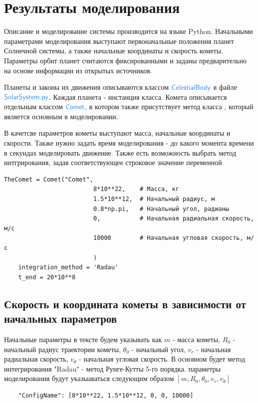 \section{Результаты моделирования}
Описание и моделирование системы производится на языке Python.
Начальными параметрами моделирования выступают первоначальные положения планет Солнечной системы,
а также начальные координаты и скорость кометы. Параметры орбит планет считаются фиксированными и заданы предварительно
на основе информации из открытых источников.

Планеты и законы их движения описываются классом $\cdw{CelestialBody}$ в файле $\cdw{SolarSystem.py}$.
Каждая планета - инстанция класса. Комета описывается отдельным классом $\cdw{Comet}$, в котором также 
присутствует метод класса , который является основным в моделировании.

В качетсве параметров кометы выступают масса, начальные координаты и скорости. Также нужно задать время моделирования
 - до какого момента времени в секундах моделировать движение. Также есть возможность выбрать метод
интгрирования, задав соответствующее строковое значение переменной 
\begin{lstlisting}[caption={Блок параметров симуляции},captionpos=b]
	TheComet = Comet("Comet",
                         8*10**22,    # Масса, кг
                         1.5*10**12,  # Начальный радиус, м
                         0.8*np.pi,   # Начальный угол, радианы
                         0,           # Начальная радиальная скорость, м/c
                         10000        # Начальная угловая скорость, м/с
				         )
	integration_method = 'Radau'
	t_end = 20*10**8
\end{lstlisting}
\subsection{Скорость и координата кометы в зависимости от начальных параметров}
Начальные параметры в тексте будем указывать как $m$ - масса кометы, $R_0$ - начальный радиус
траектории кометы, $\theta_0$ - начальный угол, $v_r$ - начальная радиальная скорость,
$v_\theta$ - начальная угловая скорость. В основном будет метод интегрирования "Radau" -
метод Рунге-Кутты 5-го порядка. параметры моделирования будут указыаваться следующим образом
$[m, R_0, \theta_0, v_r, v_\theta]$
\begin{lstlisting}
	"ConfigName": [8*10**22, 1.5*10**12, 0, 0, 10000]
\end{lstlisting}


